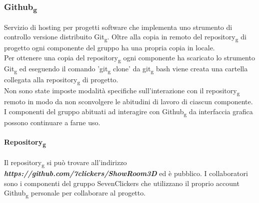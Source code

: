 \subsubsection{Github\textsubscript{g}}
\label{Github}
Servizio di hosting per progetti software che implementa uno strumento di controllo versione distribuito Git\textsubscript{g}.
Oltre alla copia in remoto del repository\textsubscript{g} di progetto ogni componente del gruppo ha una propria copia in locale.\\
Per ottenere una copia del repository\textsubscript{g} ogni componente ha scaricato lo strumento Git\textsubscript{g} ed eseguendo il 
comando 'git\textsubscript{g} clone' da git\textsubscript{g} bash viene creata una cartella collegata alla repository\textsubscript{g} di progetto.\\
Non sono state imposte modalità specifiche sull'interazione con il repository\textsubscript{g} remoto in modo da non sconvolgere le abitudini di lavoro di 
ciascun componente.\\
I componenti del gruppo abituati ad interagire con Github\textsubscript{g} da interfaccia grafica possono continuare a farne uso.
\paragraph{Repository\textsubscript{g}}
Il repository\textsubscript{g} si può trovare all'indirizzo \textbf{\textit{https://github.com/7clickers/ShowRoom3D}} ed è pubblico. 
I collaboratori sono i componenti del gruppo SevenClickers che utilizzano il proprio account Github\textsubscript{g} personale per collaborare al progetto.
